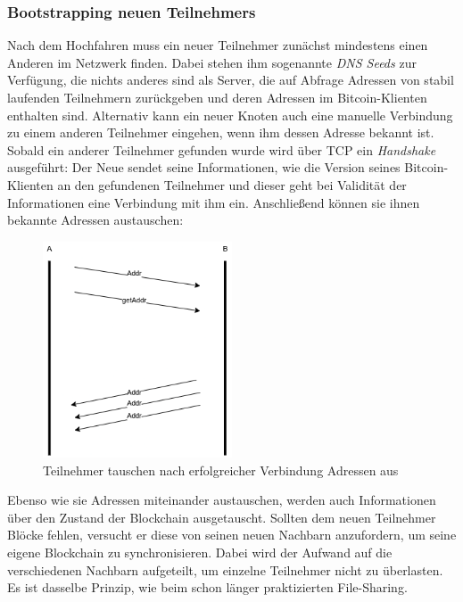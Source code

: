 \subsubsection{Bootstrapping neuen Teilnehmers}
Nach dem Hochfahren muss ein neuer Teilnehmer zunächst mindestens einen Anderen im Netzwerk finden. Dabei stehen ihm sogenannte \emph{DNS Seeds} zur Verfügung, die nichts anderes sind als Server, die auf Abfrage Adressen von stabil laufenden Teilnehmern zurückgeben und deren Adressen im Bitcoin-Klienten enthalten sind. 
Alternativ kann ein neuer Knoten auch eine manuelle Verbindung zu einem anderen Teilnehmer eingehen, wenn ihm dessen Adresse bekannt ist.\\
Sobald ein anderer Teilnehmer gefunden wurde wird über TCP ein \emph{Handshake} ausgeführt: Der Neue sendet seine Informationen, wie die Version seines Bitcoin-Klienten an den gefundenen Teilnehmer und dieser geht bei Validität der Informationen eine Verbindung mit ihm ein.
Anschließend können sie ihnen bekannte Adressen austauschen:
\begin{figure}[htpb]
	\centering
	\includegraphics[width=0.5\textwidth]{images/adress_query.png}
	\caption{Teilnehmer tauschen nach erfolgreicher Verbindung Adressen aus}
	\label{6braun:fig:adress_query}
\end{figure}

Ebenso wie sie Adressen miteinander austauschen, werden auch Informationen über den Zustand der Blockchain ausgetauscht. Sollten dem neuen Teilnehmer Blöcke fehlen, versucht er diese von seinen neuen Nachbarn anzufordern, um seine eigene Blockchain zu synchronisieren. Dabei wird der Aufwand auf die verschiedenen Nachbarn aufgeteilt, um einzelne Teilnehmer nicht zu überlasten. Es ist dasselbe Prinzip, wie beim schon länger praktizierten File-Sharing.
